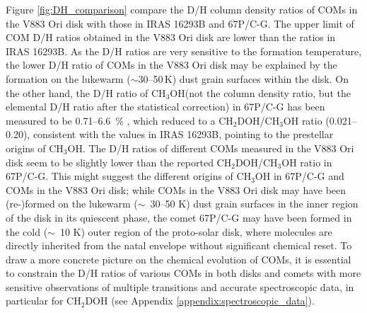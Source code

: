 \documentclass[linenumbers, twocolumn, twocolappendix, astrosymb, times]{aastex631}
\newcommand{\methanol}{CH$_3$OH\xspace}
\newcommand{\acetaldehyde}{CH$_3$CHO\xspace}
\newcommand{\methylformate}{CH$_3$OCHO\xspace}
\begin{document}
\textrm{Figure \ref{fig:DH_comparison} compare the D/H column density ratios of COMs in the V883 Ori disk with those in IRAS 16293B and 67P/C-G. The upper limit of COM D/H ratios obtained in the V883 Ori disk are lower than the ratios in IRAS 16293B. 
As the D/H ratios are very sensitive to the formation temperature, the lower D/H ratio of COMs in the V883 Ori disk may be explained by the formation on the lukewarm ($\sim30$--50\,K) dust grain surfaces within the disk. On the other hand, the D/H ratio of \methanol (not the column density ratio, but the elemental D/H ratio after the statistical correction) in 67P/C-G has been measured to be 0.71--6.6~\% \citep{Drozdovskaya2021}, which reduced to a CH$_2$DOH/CH$_3$OH ratio (0.021--0.20), consistent with the values in IRAS 16293B, pointing to the prestellar origins of \methanol \citep{Drozdovskaya2021}. The D/H ratios of different COMs measured in the V883 Ori disk seem to be slightly lower than the reported CH$_2$DOH/CH$_3$OH ratio in 67P/C-G. This might suggest the different origins of \methanol in 67P/C-G and COMs in the V883 Ori disk; while COMs in the V883 Ori disk may have been (re-)formed on the lukewarm ($\sim$~30--50 K) dust grain surfaces in the inner region of the disk in its quiescent phase, the comet 67P/C-G may have been formed in the cold ($\sim$~10 K) outer region of the proto-solar disk, where molecules are directly inherited from the natal envelope without significant chemical reset. To draw a more concrete picture on the chemical evolution of COMs, it is essential to constrain the D/H ratios of various COMs in both disks and comets with more sensitive observations of multiple transitions and accurate spectroscopic data, in particular for CH$_2$DOH (see Appendix \ref{appendix:spectroscopic_data}).}
\end{document}
